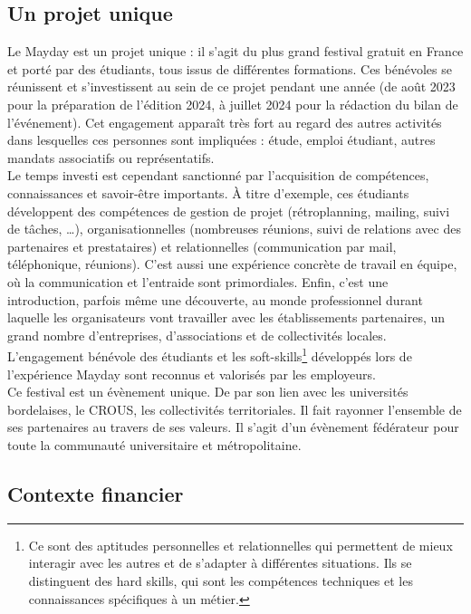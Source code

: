 \documentclass[12pt,a4paper]{report}
\begin{document}
\subsection*{Un projet unique}

Le Mayday est un projet unique : il s'agit du plus grand festival gratuit en France et porté par des étudiants, tous issus de différentes formations. Ces bénévoles se réunissent et s'investissent au sein de ce projet pendant une année (de août 2023 pour la préparation de l'édition 2024, à juillet 2024 pour la rédaction du bilan de l’événement). Cet engagement apparaît très fort au regard des autres activités dans lesquelles ces personnes sont impliquées : étude, emploi étudiant, autres mandats associatifs ou représentatifs.\\

\sloppy Le temps investi est cependant sanctionné par l'acquisition de compétences, connaissances et savoir-être importants. À titre d'exemple, ces étudiants développent des compétences de gestion de projet (rétroplanning, mailing, suivi de tâches, …), organisationnelles (nombreuses réunions, suivi de relations avec des partenaires et prestataires) et relationnelles (communication par mail, téléphonique, réunions). C’est aussi une expérience concrète de travail en équipe, où la communication et l'entraide sont primordiales. Enfin, c’est une introduction, parfois même une découverte, au monde professionnel durant laquelle les organisateurs vont travailler avec les établissements partenaires, un grand nombre d'entreprises, d’associations et de collectivités locales.\\

L’engagement bénévole des étudiants et les soft-skills\footnote{Ce sont des aptitudes personnelles et relationnelles qui permettent de mieux interagir avec les autres et de s'adapter à différentes situations. Ils se distinguent des hard skills, qui sont les compétences techniques et les connaissances spécifiques à un métier.} développés lors de l’expérience Mayday sont reconnus et valorisés par les employeurs.\\

Ce festival est un évènement unique. De par son lien avec les universités bordelaises, le CROUS, les collectivités territoriales. Il fait rayonner l'ensemble de ses partenaires au travers de ses valeurs. Il s’agit d’un évènement fédérateur pour toute la communauté universitaire et métropolitaine.

\subsection*{Contexte financier}
\end{document}
